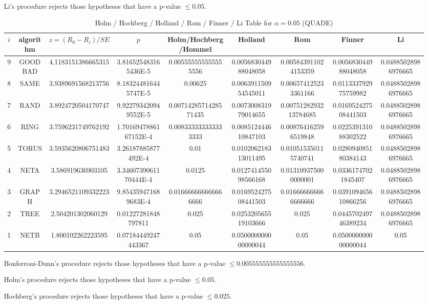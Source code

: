 \documentclass[a4paper,10pt]{article}
\begin{document}
\begin{landscape}
Li's procedure rejects those hypotheses that have a p-value $\le0.05$.



\newpage

\begin{table}[!htp]
\centering\scriptsize
\caption{Holm / Hochberg / Holland / Rom / Finner / Li Table for $\alpha=0.05$ (QUADE)}
\begin{tabular}{ccccccccc}
$i$&algorithm&$z=(R_0 - R_i)/SE$&$p$&Holm/Hochberg/Hommel&Holland&Rom&Finner&Li\\
\hline
9& GOODBAD&4.1183151386665315&3.816525483165436E-5&0.005555555555555556&0.005683044988048058&0.005843911024153359&0.005683044988048058&0.04885028986976665\\
8& SAME&3.9389691568213756&8.183244816445747E-5&0.00625&0.006391150954545011&0.006574125233361166&0.011333792975759982&0.04885028986976665\\
7& RAND&3.8924720504170747&9.922793420949552E-5&0.0071428571428571435&0.007300831979014655&0.0075128293213784685&0.016952427508441503&0.04885028986976665\\
6& RING&3.7596231749762192&1.7016947886167152E-4&0.008333333333333333&0.008512444610847103&0.008764162596519848&0.022539131088302522&0.04885028986976665\\
5& TORUS&3.5935620806751483&3.26187885877492E-4&0.01&0.010206218313011495&0.010515350115740741&0.028094085180384143&0.04885028986976665\\
4& NETA&3.586919636903105&3.3460739061170444E-4&0.0125&0.012741455098566168&0.013109375000000001&0.03361747021845407&0.04885028986976665\\
3& GRAPH&3.2946521109332223&9.854359471689683E-4&0.016666666666666666&0.016952427508441503&0.016666666666666666&0.039109465610866256&0.04885028986976665\\
2& TREE&2.504201302060129&0.01227281848797811&0.025&0.025320565519103666&0.025&0.044570249746389234&0.04885028986976665\\
1& NETB&1.800102262223595&0.07184449247443367&0.05&0.050000000000000044&0.05&0.050000000000000044&0.05\\
\hline
\end{tabular}
\end{table}
Bonferroni-Dunn's procedure rejects those hypotheses that have a p-value $\le0.005555555555555556$.


Holm's procedure rejects those hypotheses that have a p-value $\le0.05$.


Hochberg's procedure rejects those hypotheses that have a p-value $\le0.025$.



\end{landscape}
\end{document}
